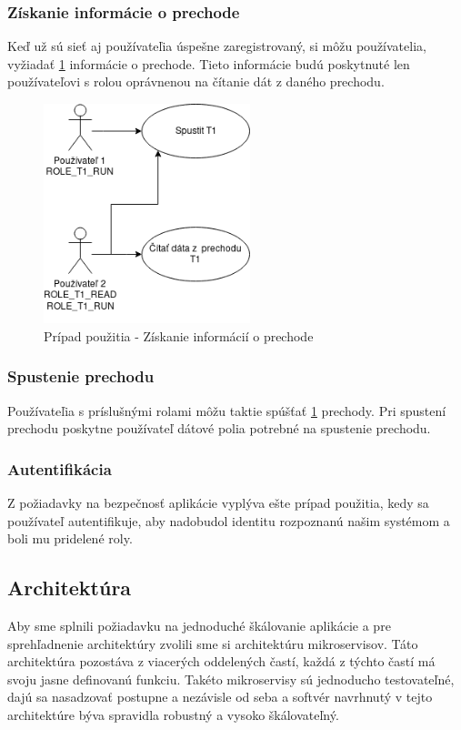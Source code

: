 \subsubsection{Získanie informácie o prechode}
Keď už sú sieť aj používateľia úspešne zaregistrovaný, si môžu používatelia, vyžiadať \ref{usecase2} informácie o prechode. Tieto informácie budú poskytnuté len používateľovi s rolou oprávnenou na čítanie dát z daného prechodu.

\begin{figure}[!htbp]
	\centering
	\includegraphics[width=6cm]{img/dp_usecase_2_read_run.png}
	\caption{Prípad použitia - Získanie informácií o prechode}
	\label{usecase2}
\end{figure} 

\subsubsection{Spustenie prechodu}
Používateľia s príslušnými rolami môžu taktie spúšťať \ref{usecase2} prechody. Pri spustení prechodu poskytne používateľ dátové polia potrebné na spustenie prechodu. 

\subsubsection{Autentifikácia}
Z požiadavky na bezpečnosť aplikácie vyplýva ešte prípad použitia, kedy sa používateľ autentifikuje, aby nadobudol identitu rozpoznanú našim systémom a boli mu pridelené roly. 


\subsection{Architektúra} 

Aby sme splnili požiadavku na jednoduché škálovanie aplikácie a pre sprehľadnenie architektúry zvolili sme si architektúru mikroservisov. Táto architektúra pozostáva z viacerých oddelených častí, každá z týchto častí má svoju jasne definovanú funkciu. Takéto mikroservisy sú jednoducho testovateľné, dajú sa nasadzovať postupne a nezávisle od seba a softvér navrhnutý v tejto architektúre býva spravidla robustný a vysoko škálovateľný.  

